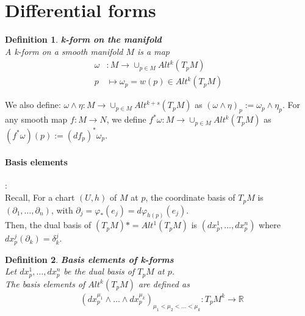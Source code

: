 \documentclass[11pt]{book} %
\newtheorem{definition}{Definition}[section]
\begin{document}

\section{Differential forms}

\begin{definition}{\textbf{k-form on the manifold}} \\
    A k-form on a smooth manifold \( M \) is a map 
    \begin{align*}
        \omega &: M \to \cup_{p \in M} Alt^k(T_pM) \\
        p &\mapsto \omega_p = w(p) \in Alt^k(T_pM)
    \end{align*}
\end{definition}

\bigbreak

We also define: $\omega \wedge \eta : M \to \cup_{p \in M} Alt^{k+s}(T_pM)$ as $(\omega \wedge \eta)_p := \omega_p \wedge \eta_p$. 
\medbreak
For any smooth map $f : M \to N$, we define $f^* \omega : M \to \cup_{p \in M} Alt^k(T_pM)$ as \\
$(f^* \omega)(p) := (df_p)^* \omega_{p}$.

\paragraph{Basis elements}: \\
Recall, For a chart $(U, h)$ of $M$ at $p$, the coordinate basis of $T_pM$ is $( \partial_1, \ldots, \partial_n )$, with $\partial_j = \varphi_*(e_j) = d\varphi_{h(p)}(e_j)$. \\
Then, the dual basis of $(T_pM)* = Alt^1(T_pM)$ is $( dx_p^1, \ldots, dx_p^n )$ where $dx_p^j(\partial_k) = \delta_k^j$.

\begin{definition}\textbf{Basis elements of k-forms} \\
    Let $dx_p^1, \ldots, dx_p^n$ be the dual basis of $T_pM$ at $p$. \\
    The basis elements of $Alt^k(T_pM)$ are defined as
    \begin{align*}
        &(dx_p^{\mu_1} \wedge \ldots \wedge dx_p^{\mu_k})_{\mu_1 < \mu_2 < \ldots < \mu_k} : T_pM^k \to \mathbb{R} 
    \end{align*}
\end{definition}
\end{document}
